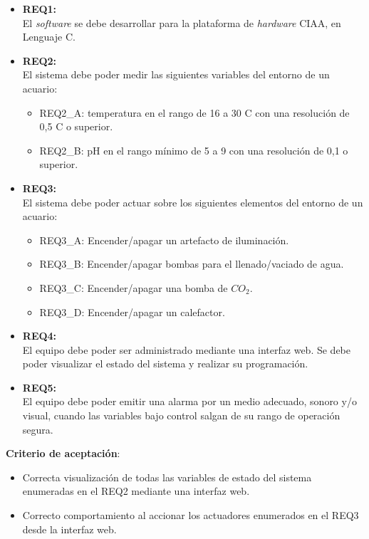 \begin{itemize}
	\item \textbf{REQ1:}\\ El \textit{software} se debe desarrollar para la plataforma de \textit{hardware} CIAA, en Lenguaje C.
	\item \textbf{REQ2:}\\ El sistema debe poder medir las siguientes variables del entorno de un acuario:
	\begin{itemize}
		\item REQ2\_A: temperatura en el rango de 16 a 30 \grados C con una resolución de 0,5 \grados C o superior.
		\item REQ2\_B: pH en el rango mínimo de 5 a 9 con una resolución de 0,1 o superior.
	\end{itemize}
	\item \textbf{REQ3:}\\ El sistema debe poder actuar sobre los siguientes elementos del entorno de un acuario:
	\begin{itemize}
		\item REQ3\_A: Encender/apagar un artefacto de iluminación.
		\item REQ3\_B: Encender/apagar bombas para el llenado/vaciado de agua.
		\item REQ3\_C: Encender/apagar una bomba de $CO_2$.
		\item REQ3\_D: Encender/apagar un calefactor.
	\end{itemize}
	\item \textbf{REQ4:}\\ El equipo debe poder ser administrado mediante una interfaz web. Se debe poder visualizar el estado del sistema y realizar su programación.
	\item \textbf{REQ5:}\\ El equipo debe poder emitir una alarma por un medio adecuado, sonoro y/o visual, cuando las variables bajo control salgan de su rango de operación segura.
\end{itemize}

\textbf{Criterio de aceptación}:
	\begin{itemize}
		\item Correcta visualización de todas las variables de estado del sistema enumeradas en el REQ2 mediante una interfaz web.
		\item Correcto comportamiento al accionar los actuadores enumerados en el REQ3 desde la interfaz web.
	\end{itemize}

